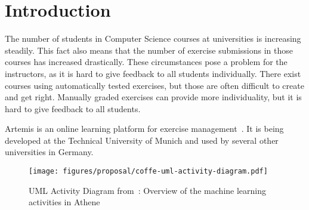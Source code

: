 
\def\proposal{Proposal for}

\usepackage[nolist]{acronym}
\usepackage{csquotes}


\setlength{\evensidemargin}{22pt}
\setlength{\oddsidemargin}{22pt}



\lstset{showspaces=false, numbers=left, frame=single, basicstyle=\small}




\fancyhead{}
\pagestyle{fancy}
\fancyhead[LE]{\slshape \leftmark}
\fancyhead[RO]{\slshape \rightmark}
\headheight=15pt

\section*{Introduction}

The number of students in Computer Science courses at universities is increasing steadily. This fact also means that the number of exercise submissions in those courses has increased drastically.
These circumstances pose a problem for the instructors, as it is hard to give feedback to all students individually. There exist courses using automatically tested exercises, but those are often difficult to create and get right. Manually graded exercises can provide more individuality, but it is hard to give feedback to all students.

Artemis is an online learning platform for exercise management~\cite{ArTEMiS}. It is being developed at the Technical University of Munich and used by several other universities in Germany. 

\begin{figure}[ht]
    \centering
    \texttt{[image: figures/proposal/coffe-uml-activity-diagram.pdf]}
    \caption{UML Activity Diagram from~\cite{cofee}: Overview of the machine learning activities in Athene}
    \label{fig:coffeeUmlActivityDiagram}
\end{figure}

